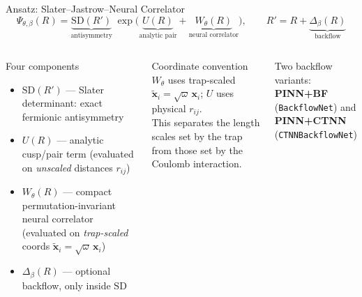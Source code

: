 \documentclass[aspectratio=169,10pt]{beamer}
\begin{document}
\begin{frame}{Ansatz: Slater--Jastrow--Neural Correlator}
  \begin{equation*}
    \Psi_{\theta,\beta}(R)
    = \underbrace{\mathrm{SD}(R')}_{\text{antisymmetry}}\;
      \exp\!\bigl(
        \underbrace{U(R)}_{\text{analytic pair}}
        +\underbrace{W_\theta(R)}_{\text{neural correlator}}
      \bigr),
    \qquad
    R' = R + \underbrace{\Delta_\beta(R)}_{\text{backflow}}
  \end{equation*}

  \vspace{0.2cm}
  \begin{columns}[T]
      \begin{block}{Four components}
        \begin{itemize}
          \item $\mathrm{SD}(R')$ — Slater determinant: exact fermionic
                antisymmetry
          \item $U(R)$ — analytic cusp/pair term (evaluated on \emph{unscaled}
                distances $r_{ij}$)
          \item $W_\theta(R)$ — compact permutation-invariant neural correlator
                (evaluated on \emph{trap-scaled} coords $\tilde{\mathbf x}_i
                = \sqrt\omega\,\mathbf x_i$)
          \item $\Delta_\beta(R)$ — optional backflow, only inside $\mathrm{SD}$
        \end{itemize}
      \end{block}
      \begin{alertblock}{Coordinate convention}
        $W_\theta$ uses trap-scaled $\tilde{\mathbf x}_i=\sqrt\omega\,\mathbf x_i$;
        $U$ uses physical $r_{ij}$.\\[5pt]
        This separates the length scales set by the trap from those set by the
        Coulomb interaction.
      \end{alertblock}
      \vspace{0.3cm}
      Two backflow variants:\\
      \textbf{PINN+BF} (\texttt{BackflowNet}) and\\
      \textbf{PINN+CTNN} (\texttt{CTNNBackflowNet})
  \end{columns}
\end{frame}
\end{document}
